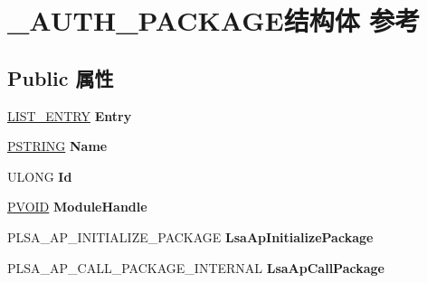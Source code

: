 \hypertarget{struct___a_u_t_h___p_a_c_k_a_g_e}{}\section{\+\_\+\+A\+U\+T\+H\+\_\+\+P\+A\+C\+K\+A\+G\+E结构体 参考}
\label{struct___a_u_t_h___p_a_c_k_a_g_e}
\subsection*{Public 属性}
\begin{DoxyCompactItemize}
\item 
\mbox{\label{struct___a_u_t_h___p_a_c_k_a_g_e_aadf2f4d1301aeb2a04f695875b6a04b3}} 
\hyperlink{struct___l_i_s_t___e_n_t_r_y}{L\+I\+S\+T\+\_\+\+E\+N\+T\+RY} {\bfseries Entry}
\item 
\mbox{\label{struct___a_u_t_h___p_a_c_k_a_g_e_ac2f465b1683607c624f8592ba0e5f238}} 
\hyperlink{struct___s_t_r_i_n_g}{P\+S\+T\+R\+I\+NG} {\bfseries Name}
\item 
\mbox{\label{struct___a_u_t_h___p_a_c_k_a_g_e_a84fdebe43aae4d852b3d5b420478a6d0}} 
U\+L\+O\+NG {\bfseries Id}
\item 
\mbox{\label{struct___a_u_t_h___p_a_c_k_a_g_e_a9c1a44c6aaac2308d801b8212cba1c33}} 
\hyperlink{interfacevoid}{P\+V\+O\+ID} {\bfseries Module\+Handle}
\item 
\mbox{\label{struct___a_u_t_h___p_a_c_k_a_g_e_a61a56a617ce18f8c64ceb3349bb292a1}} 
P\+L\+S\+A\+\_\+\+A\+P\+\_\+\+I\+N\+I\+T\+I\+A\+L\+I\+Z\+E\+\_\+\+P\+A\+C\+K\+A\+GE {\bfseries Lsa\+Ap\+Initialize\+Package}
\item 
\mbox{\label{struct___a_u_t_h___p_a_c_k_a_g_e_a9492d0265db07ead9502c13863856879}} 
P\+L\+S\+A\+\_\+\+A\+P\+\_\+\+C\+A\+L\+L\+\_\+\+P\+A\+C\+K\+A\+G\+E\+\_\+\+I\+N\+T\+E\+R\+N\+AL {\bfseries Lsa\+Ap\+Call\+Package}
\item 
\mbox{\label{struct___a_u_t_h___p_a_c_k_a_g_e_af6bc7dcaa120579596b7af86256ef2a6}} 

\end{DoxyCompactItemize}

